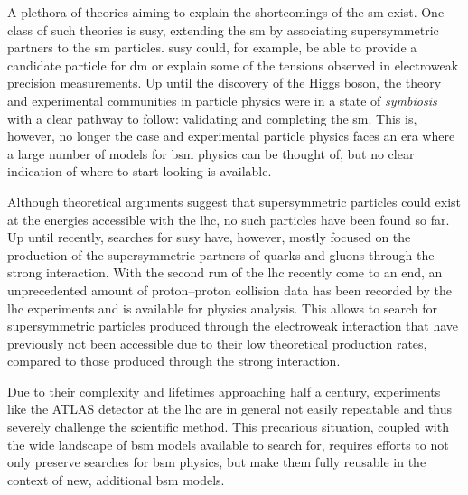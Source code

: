 A plethora of theories aiming to explain the shortcomings of the \gls{sm} exist. One class of such theories is \gls{susy}, extending the \gls{sm} by associating supersymmetric partners to the \gls{sm} particles.
\gls{susy} could, for example, be able to provide a candidate particle for \gls{dm} or explain some of the tensions observed in electroweak precision measurements.
Up until the discovery of the Higgs boson, the theory and experimental communities in particle physics were in a state of \textit{symbiosis} with a clear pathway to follow: validating and completing the \gls{sm}. This is, however, no longer the case and experimental particle physics faces an era where a large number of models for \gls{bsm} physics can be thought of, but no clear indication of where to start looking is available. 

Although theoretical arguments suggest that supersymmetric particles could exist at the energies accessible with the \gls{lhc}, no such particles have been found so far.
Up until recently, searches for \gls{susy} have, however, mostly focused on the production of the supersymmetric partners of quarks and gluons through the strong interaction.
With the second run of the \gls{lhc} recently come to an end, an unprecedented amount of proton--proton collision data has been recorded by the \gls{lhc} experiments and is available for physics analysis.
This allows to search for supersymmetric particles produced through the electroweak interaction that have previously not been accessible due to their low theoretical production rates, compared to those produced through the strong interaction.

Due to their complexity and lifetimes approaching half a century, experiments like the ATLAS detector at the \gls{lhc} are in general not easily repeatable and thus severely challenge the scientific method.
This precarious situation, coupled with the wide landscape of \gls{bsm} models available to search for, requires efforts to not only preserve searches for \gls{bsm} physics, but make them fully reusable in the context of new, additional \gls{bsm} models. 

